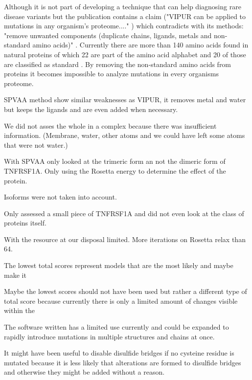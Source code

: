 Although it is not part of developing a technique that can help diagnosing rare disease variants but the publication contains a claim ("VIPUR can be applied to mutations in any organism’s proteome...." \cite{}) which contradicts with its methods: "remove unwanted components (duplicate chains, ligands, metals and non-standard amino acids)" \cite{}. Currently there are more than 140 amino acids found in natural proteins of which 22 are part of the amino acid alphabet and 20 of those are classified as standard \cite{}. By removing the non-standard amino acids from proteins it becomes impossible to analyze mutations in every organisms proteome.



SPVAA method show similar weaknesses as VIPUR, it removes metal and water but keeps the ligands and are even added when necessary.

We did not asses the whole in a complex because there was insufficient information. (Membrane, water, other atoms and we could have left some atoms that were not water.)

With SPVAA only looked at the trimeric form an not the dimeric form of TNFRSF1A.
Only using the Rosetta energy to determine the effect of the protein.

Isoforms were not taken into account.

Only assessed a small piece of TNFRSF1A and did not even look at the class of proteins itself.

With the resource at our disposal  limited.
More iterations on Rosetta relax than 64\cite{}.

The lowest total scores represent models that are the most likely and maybe make it 

Maybe the lowest scores should not have been used but rather a different type of total score because currently there is only a limited amount of changes visible within the 

The software written has a limited use currently and could be expanded to rapidly introduce mutations in multiple structures and chains at once.

It might have been useful to disable disulfide bridges if no cysteine residue is mutated because it is less likely that alterations are formed to disulfide bridges and otherwise they might be added without a reason.

